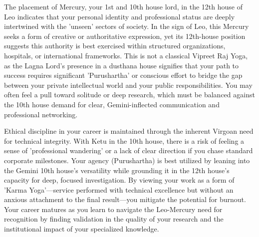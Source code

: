 {\fontsize{9}{13}\selectfont The placement of Mercury, your 1st and 10th house lord, in the 12th house of Leo indicates that your personal identity and professional status are deeply intertwined with the 'unseen' sectors of society. In the sign of Leo, this Mercury seeks a form of creative or authoritative expression, yet its 12th-house position suggests this authority is best exercised within structured organizations, hospitals, or international frameworks. This is not a classical Vipreet Raj Yoga, as the Lagna Lord's presence in a dusthana house signifies that your path to success requires significant 'Purushartha' or conscious effort to bridge the gap between your private intellectual world and your public responsibilities. You may often feel a pull toward solitude or deep research, which must be balanced against the 10th house demand for clear, Gemini-inflected communication and professional networking.}\par\vspace{1.8mm}

{\fontsize{9}{13}\selectfont Ethical discipline in your career is maintained through the inherent Virgoan need for technical integrity. With Ketu in the 10th house, there is a risk of feeling a sense of 'professional wandering' or a lack of clear direction if you chase standard corporate milestones. Your agency (Purushartha) is best utilized by leaning into the Gemini 10th house's versatility while grounding it in the 12th house's capacity for deep, focused investigation. By viewing your work as a form of 'Karma Yoga'---service performed with technical excellence but without an anxious attachment to the final result---you mitigate the potential for burnout. Your career matures as you learn to navigate the Leo-Mercury need for recognition by finding validation in the quality of your research and the institutional impact of your specialized knowledge.}\par\vspace{1.8mm}

